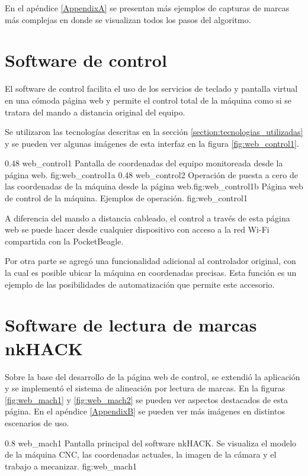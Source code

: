          En el apéndice \ref{AppendixA} se presentan más ejemplos de capturas de marcas más complejas en donde se visualizan todos los pasos del algoritmo.\par

\section{Software de control}

   El software de control facilita el uso de los servicios de teclado y pantalla virtual en una cómoda página web y permite el control total de la máquina como si se tratara del mando a distancia original del equipo.\par
   Se utilizaron las tecnologías descritas en la sección \ref{section:tecnologias_utilizadas} y se pueden ver algunas imágenes de esta interfaz en la figura \ref{fig:web_control1}.

\subfigab 
{0.48} {web_control1} {Pantalla de coordenadas del equipo monitoreada desde la página web.} {fig:web_control1a}
{0.48} {web_control2} {Operación de puesta a cero de las coordenadas de la máquina desde la página web.}{fig:web_control1b}
      {Página web de control de la máquina. Ejemplos de operación.}
      {fig:web_control1}

   A diferencia del mando a distancia cableado, el control a través de esta página web se puede hacer desde cualquier dispositivo con acceso a la red Wi-Fi compartida con la PocketBeagle.\par
   Por otra parte se agregó una funcionalidad adicional al controlador original, con la cual es posible ubicar la máquina en coordenadas precisas. Esta función es un ejemplo de las posibilidades de automatización que permite este accesorio.\par
\pagebreak
\section{Software de lectura de marcas nkHACK}
\label{section:software_lectura_marcas}

Sobre la base del desarrollo de la página web de control, se extendió la aplicación y se implementó el sistema de alineación por lectura de marcas.
   En la figuras \ref{fig:web_mach1} y \ref{fig:web_mach2} se pueden ver aspectos destacados de esta página. En el apéndice \ref{AppendixB} se pueden ver más imágenes en distintos escenarios de uso.

\subfiga
{0.8} {web_mach1} {Pantalla principal del software nkHACK. Se visualiza el modelo de la máquina CNC, las coordenadas actuales, la imagen de la cámara y el trabajo a mecanizar.} {fig:web_mach1}


